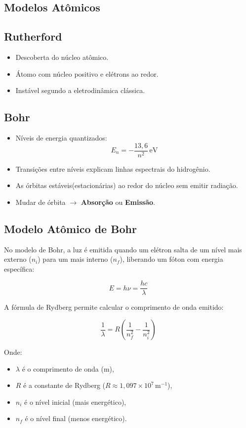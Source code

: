 \documentclass[a4paper,12pt]{article}
\begin{document}
\begin{multicols}{2}
\section{Modelos Atômicos}
\subsection{Rutherford}
\begin{itemize}
    \item Descoberta do núcleo atômico.
    \item Átomo com núcleo positivo e elétrons ao redor.
    \item Instável segundo a eletrodinâmica clássica.
\end{itemize}

\subsection{Bohr}
\begin{itemize}
    \item Níveis de energia quantizados:
    \[
        E_n = -\frac{13{,}6}{n^2} \, \text{eV}
    \]
    \item Transições entre níveis explicam linhas espectrais do hidrogênio.
    \item As órbitas estáveis(estacionárias) ao redor do núcleo sem emitir radiação.
    \item Mudar de órbita $\rightarrow$ \textbf{Absorção} ou \textbf{Emissão}.
\end{itemize}

\subsection{Modelo Atômico de Bohr}

No modelo de Bohr, a luz é emitida quando um elétron salta de um nível mais externo ($n_i$) para um mais interno ($n_f$), liberando um fóton com energia específica:

\[
E = h \nu = \frac{hc}{\lambda}
\]

\noindent A fórmula de Rydberg permite calcular o comprimento de onda emitido:

\[
\frac{1}{\lambda} = R \left( \frac{1}{n_f^2} - \frac{1}{n_i^2} \right)
\]

\noindent Onde:
\begin{itemize}
  \item $\lambda$ é o comprimento de onda (m),
  \item $R$ é a constante de Rydberg ($R \approx 1{,}097 \times 10^7 \, \text{m}^{-1}$),
  \item $n_i$ é o nível inicial (mais energético),
  \item $n_f$ é o nível final (menos energético).
\end{itemize}


\end{multicols}
\end{document}
